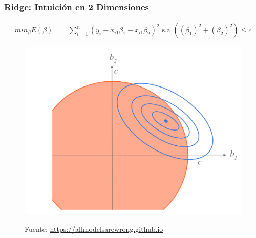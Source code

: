 \documentclass[
  shownotes,
  xcolor={svgnames},
  hyperref={colorlinks,citecolor=DarkBlue,linkcolor=andesred,urlcolor=DarkBlue}
  , aspectratio=169]{beamer}
\begin{document}
\begin{frame}[fragile]
\frametitle{Ridge: Intuición en 2 Dimensiones }

\begin{align}
     min_{\beta} E(\beta) &= \sum_{i=1}^n (y_i - x_{i1}\beta_1 - x_{i1}\beta_2)^2  \text{ s.a }   \left( (\beta_1)^2 + (\beta_2)^2 \right) \leq c 
  \end{align}

\begin{figure}[H] \centering
            \captionsetup{justification=centering}
              \includegraphics[scale=0.3]{figures/ridge2}
 
\tiny
Fuente: \url{https://allmodelsarewrong.github.io}
\end{figure}


\end{frame}
\end{document}
